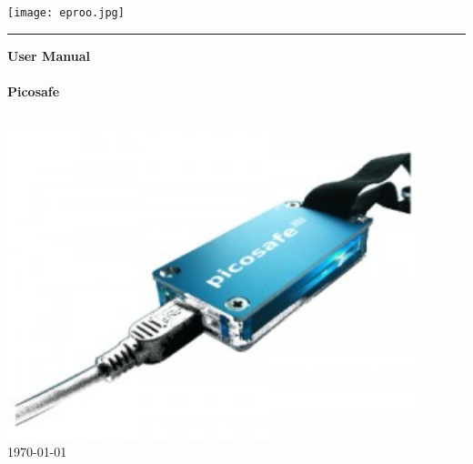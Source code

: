 \thispagestyle{empty}

\begin{titlepage}

\newcommand{\Rule}{\rule{\textwidth}{0.5mm}}
\texttt{[image: eproo.jpg]} \\

\Rule\vspace{11mm}
\begin{center}
 {\Huge \bfseries{User Manual}}\\ \ \\
 {\Huge \bfseries{Picosafe}}\\ \ \\

 \vfill
 \vfill
 \vfill

\includegraphics[width=12cm]{images/picosafe_splash.png} \\

 \normalsize \today
 \vfill
\end{center}
\end{titlepage}

\thispagestyle{empty}
\cleardoublepage

\setcounter{page}{1}
